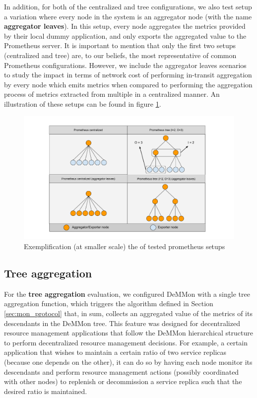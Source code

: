 In addition, for both of the centralized and tree configurations, we also test setup a variation where every node in the system is an aggregator node (with the name \textbf{aggregator leaves}). In this setup, every node aggregates the metrics provided by their local dummy application, and only exports the aggregated value to the Prometheus server. It is important to mention that only the first two setups (centralized and tree) are, to our beliefs, the most representative of common Prometheus configurations.  However, we include the aggregator leaves scenarios to study the impact in terms of network cost of performing in-transit aggregation by every node which emits metrics when compared to performing the aggregation process of metrics extracted from multiple in a centralized manner. An illustration of these setups can be found in figure \ref{fig:sec:eval_prom_setups}.

\begin{figure}
    \centering
    \includegraphics[width=\linewidth]{Chapters/evaluation/figures/aggregation/Prometheus setups.pdf}
    \caption{Exemplification (at smaller scale) the of tested prometheus setups}
    \label{fig:sec:eval_prom_setups}
\end{figure}

\subsection{Tree aggregation}

For the \textbf{tree aggregation} evaluation, we configured DeMMon with a single tree aggregation function, which triggers the algorithm defined in Section \ref{sec:mon_protocol} that, in sum, collects an aggregated value of the metrics of its descendants in the DeMMon tree. This feature was designed for decentralized resource management applications that follow the DeMMon hierarchical structure to perform decentralized resource management decisions. For example, a certain application that wishes to maintain a certain ratio of two service replicas (because one depends on the other), it can do so by having each node monitor its descendants and perform resource management actions (possibly coordinated with other nodes) to replenish or decommission a service replica such that the desired ratio is maintained.

